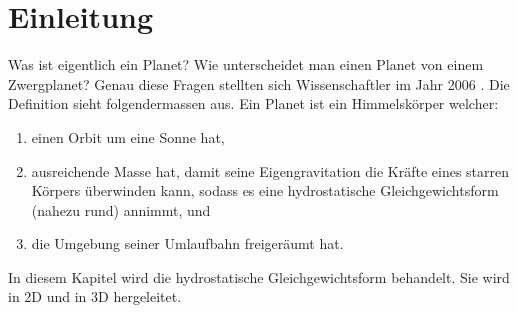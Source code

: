 %
%
%
%
\section{Einleitung\label{planet:section:einleitung}}
Was ist eigentlich ein Planet?
Wie unterscheidet man einen Planet von einem Zwergplanet?
Genau diese Fragen stellten sich Wissenschaftler im Jahr 2006 \cite{planet:iaub5}.
Die Definition sieht folgendermassen aus.
Ein Planet ist ein Himmelskörper welcher:
\begin{enumerate}
	\item einen Orbit um eine Sonne hat,
	\item ausreichende Masse hat, damit seine Eigengravitation die Kräfte eines starren Körpers überwinden kann, sodass es eine hydrostatische Gleichgewichtsform (nahezu rund) annimmt, und
	\item die Umgebung seiner Umlaufbahn freigeräumt hat.
\end{enumerate}

In diesem Kapitel wird die hydrostatische Gleichgewichtsform behandelt.
Sie wird in 2D und in 3D hergeleitet.


